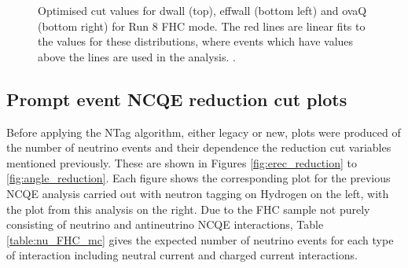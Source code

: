 \begin{figure}
\begin{minipage}{.5\linewidth}
    \end{minipage}\par\medskip
    \centering
    
    \caption{Optimised cut values for dwall (top), effwall (bottom left) and ovaQ (bottom right) for Run 8 FHC mode. The red lines are linear fits to the values for these distributions, where events which have values above the lines are used in the analysis. \cite{Abe_2019}.}
    \label{fig:optimised_dwall_effwall_ovaq}
\end{figure}
    


\subsection{Prompt event NCQE reduction cut plots}

Before applying the NTag algorithm, either legacy or new, plots were produced of the number of neutrino events and their dependence the reduction cut variables mentioned previously. These are shown in Figures \ref{fig:erec_reduction} to \ref{fig:angle_reduction}. Each figure shows the corresponding plot for the previous NCQE analysis carried out with neutron tagging on Hydrogen on the left, with the plot from this analysis on the right. Due to the FHC sample not purely consisting of neutrino and antineutrino NCQE interactions, Table \ref{table:nu_FHC_mc} gives the expected number of neutrino events for each type of interaction including neutral current and charged current interactions.

